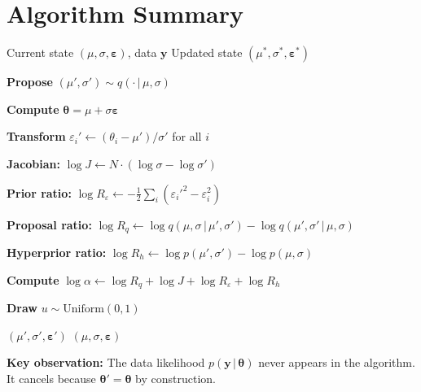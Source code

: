 \documentclass[11pt,a4paper]{article}
\theoremstyle{definition}
\newcommand{\eps}{\varepsilon}
\newcommand{\given}{\,|\,}
\begin{document}
\section{Algorithm Summary}
\label{sec:algorithm}

\begin{algorithm}[H]
\caption{Coupled Transform Metropolis-Hastings Step}
\label{alg:coupled_transform}
\begin{algorithmic}[1]
\Require Current state $(\mu, \sigma, \bm{\eps})$, data $\bm{y}$
\Ensure Updated state $(\mu^*, \sigma^*, \bm{\eps}^*)$

\State \textbf{Propose} $(\mu', \sigma') \sim q(\cdot \given \mu, \sigma)$

\State \textbf{Compute} $\bm{\theta} = \mu + \sigma \bm{\eps}$

\State \textbf{Transform} $\eps_i' \gets (\theta_i - \mu') / \sigma'$ for all $i$

\State \textbf{Jacobian:} $\log J \gets N \cdot (\log \sigma - \log \sigma')$

\State \textbf{Prior ratio:} $\log R_\eps \gets -\frac{1}{2}\sum_i (\eps_i'^2 - \eps_i^2)$

\State \textbf{Proposal ratio:} $\log R_q \gets \log q(\mu, \sigma \given \mu', \sigma') - \log q(\mu', \sigma' \given \mu, \sigma)$

\State \textbf{Hyperprior ratio:} $\log R_h \gets \log p(\mu', \sigma') - \log p(\mu, \sigma)$

\State \textbf{Compute} $\log \alpha \gets \log R_q + \log J + \log R_\eps + \log R_h$

\State \textbf{Draw} $u \sim \text{Uniform}(0, 1)$

    \State \Return $(\mu', \sigma', \bm{\eps}')$
\Else
    \State \Return $(\mu, \sigma, \bm{\eps})$
\EndIf
\end{algorithmic}
\end{algorithm}

\textbf{Key observation:} The data likelihood $p(\bm{y} \given \bm{\theta})$ never
appears in the algorithm. It cancels because $\bm{\theta}' = \bm{\theta}$ by construction.

\end{document}
